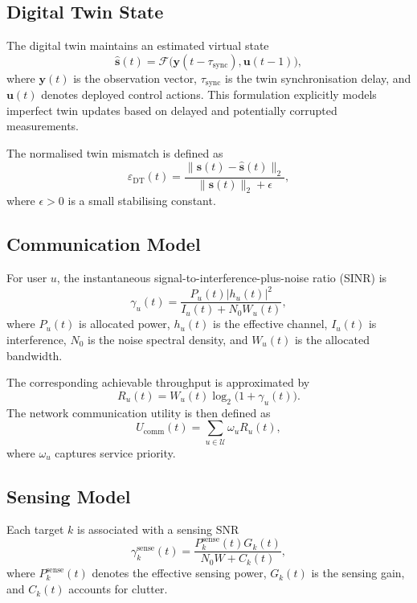 \documentclass[10pt,journal]{IEEEtran}
\begin{document}
\subsection{Digital Twin State}
The digital twin maintains an estimated virtual state
\begin{equation}
\hat{\mathbf{s}}(t)=\mathcal{F}\big(\mathbf{y}(t-\tau_{\mathrm{sync}}),\mathbf{u}(t-1)\big),
\end{equation}
where \(\mathbf{y}(t)\) is the observation vector, \(\tau_{\mathrm{sync}}\) is the twin synchronisation delay, and \(\mathbf{u}(t)\) denotes deployed control actions. This formulation explicitly models imperfect twin updates based on delayed and potentially corrupted measurements.

The normalised twin mismatch is defined as
\begin{equation}
\varepsilon_{\mathrm{DT}}(t)=
\frac{\|\mathbf{s}(t)-\hat{\mathbf{s}}(t)\|_2}
{\|\mathbf{s}(t)\|_2+\epsilon},
\end{equation}
where \(\epsilon>0\) is a small stabilising constant.

\subsection{Communication Model}
For user \(u\), the instantaneous signal-to-interference-plus-noise ratio (SINR) is
\begin{equation}
\gamma_u(t)=
\frac{P_u(t)\lvert h_u(t)\rvert^2}
{I_u(t)+N_0W_u(t)},
\end{equation}
where \(P_u(t)\) is allocated power, \(h_u(t)\) is the effective channel, \(I_u(t)\) is interference, \(N_0\) is the noise spectral density, and \(W_u(t)\) is the allocated bandwidth.

The corresponding achievable throughput is approximated by
\begin{equation}
R_u(t)=W_u(t)\log_2\big(1+\gamma_u(t)\big).
\end{equation}
The network communication utility is then defined as
\begin{equation}
U_{\mathrm{comm}}(t)=\sum_{u\in\mathcal{U}} \omega_u R_u(t),
\end{equation}
where \(\omega_u\) captures service priority.

\subsection{Sensing Model}
Each target \(k\) is associated with a sensing SNR
\begin{equation}
\gamma_k^{\mathrm{sense}}(t)=
\frac{P_k^{\mathrm{sense}}(t)G_k(t)}
{N_0W + C_k(t)},
\end{equation}
where \(P_k^{\mathrm{sense}}(t)\) denotes the effective sensing power, \(G_k(t)\) is the sensing gain, and \(C_k(t)\) accounts for clutter.
\end{document}
